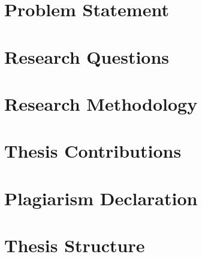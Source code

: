 \section{Problem Statement}

\section{Research Questions}

\section{Research Methodology}

\section{Thesis Contributions}

\section{Plagiarism Declaration}

\section{Thesis Structure}

